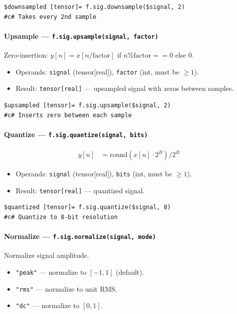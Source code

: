 \begin{verbatim}
$downsampled [tensor]= f.sig.downsample($signal, 2)
#c# Takes every 2nd sample
\end{verbatim}

\paragraph{Upsample --- \texttt{f.sig.upsample(signal, factor)}}
Zero-insertion: $y[n] = x[n/\text{factor}]$ if $n \% \text{factor} == 0$ else $0$.

\begin{itemize}
\item Operands: \texttt{signal} (tensor[real]), \texttt{factor} (int, must be $\geq 1$).
\item Result: \texttt{tensor[real]} --- upsampled signal with zeros between samples.
\end{itemize}

\begin{verbatim}
$upsampled [tensor]= f.sig.upsample($signal, 2)
#c# Inserts zero between each sample
\end{verbatim}

\paragraph{Quantize --- \texttt{f.sig.quantize(signal, bits)}}

\begin{align}
y[n] &= \text{round}(x[n] \cdot 2^B) / 2^B \label{eq:sig-quantize}
\end{align}

\begin{itemize}
\item Operands: \texttt{signal} (tensor[real]), \texttt{bits} (int, must be $\geq 1$).
\item Result: \texttt{tensor[real]} --- quantized signal.
\end{itemize}

\begin{verbatim}
$quantized [tensor]= f.sig.quantize($signal, 8)
#c# Quantize to 8-bit resolution
\end{verbatim}

\paragraph{Normalize --- \texttt{f.sig.normalize(signal, mode)}}
Normalize signal amplitude.
\begin{itemize}
\item \texttt{"peak"} --- normalize to $[-1, 1]$ (default).
\item \texttt{"rms"} --- normalize to unit RMS.
\item \texttt{"dc"} --- normalize to $[0, 1]$.
\end{itemize}

